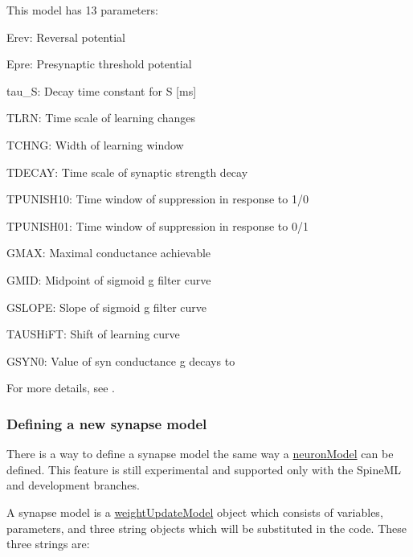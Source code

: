 This model has 13 parameters\+:
\begin{DoxyItemize}
\item {\ttfamily Erev\+:} Reversal potential
\item {\ttfamily Epre\+:} Presynaptic threshold potential
\item {\ttfamily tau\+\_\+\+S\+:} Decay time constant for S \mbox{[}ms\mbox{]}
\item {\ttfamily T\+L\+R\+N\+:} Time scale of learning changes
\item {\ttfamily T\+C\+H\+N\+G\+:} Width of learning window
\item {\ttfamily T\+D\+E\+C\+A\+Y\+:} Time scale of synaptic strength decay
\item {\ttfamily T\+P\+U\+N\+I\+S\+H10\+:} Time window of suppression in response to 1/0
\item {\ttfamily T\+P\+U\+N\+I\+S\+H01\+:} Time window of suppression in response to 0/1
\item {\ttfamily G\+M\+A\+X\+:} Maximal conductance achievable
\item {\ttfamily G\+M\+I\+D\+:} Midpoint of sigmoid g filter curve
\item {\ttfamily G\+S\+L\+O\+P\+E\+:} Slope of sigmoid g filter curve
\item {\ttfamily T\+A\+U\+S\+Hi\+F\+T\+:} Shift of learning curve
\item {\ttfamily G\+S\+Y\+N0\+:} Value of syn conductance g decays to
\end{DoxyItemize}

For more details, see \cite{nowotny2005self}.\hypertarget{Manual_sect34}{}\subsubsection{Defining a new synapse model}\label{Manual_sect34}
There is a way to define a synapse model the same way a \hyperlink{structneuronModel}{neuron\+Model} can be defined. This feature is still experimental and supported only with the Spine\+M\+L and development branches.

A synapse model is a \hyperlink{classweightUpdateModel}{weight\+Update\+Model} object which consists of variables, parameters, and three string objects which will be substituted in the code. These three strings are\+:


